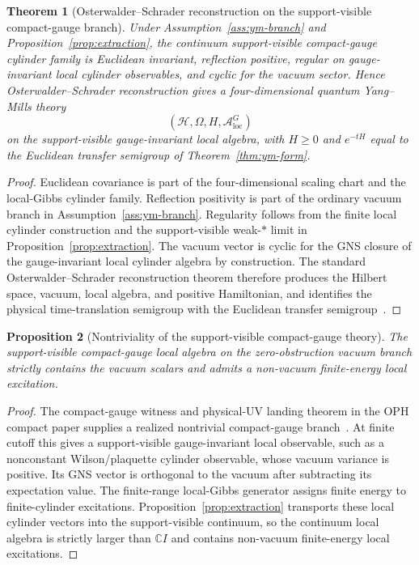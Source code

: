\documentclass[11pt]{article}
\numberwithin{equation}{section}
\newtheorem{theorem}{Theorem}[section]
\newtheorem{proposition}[theorem]{Proposition}
\theoremstyle{remark}
\newcommand{\A}{\mathcal A}
\newcommand{\Hcal}{\mathcal H}
\newcommand{\C}{\mathbb C}
\begin{document}
\begin{theorem}[Osterwalder--Schrader reconstruction on the support-visible compact-gauge branch]
\label{thm:os}
Under Assumption~\ref{ass:ym-branch} and Proposition~\ref{prop:extraction}, the continuum
support-visible compact-gauge cylinder family is Euclidean invariant, reflection positive,
regular on gauge-invariant local cylinder observables, and cyclic for the vacuum sector. Hence
Osterwalder--Schrader reconstruction gives a four-dimensional quantum Yang--Mills theory
\[
(\Hcal,\Omega,H,\A_{\mathrm{loc}}^{G})
\]
on the support-visible gauge-invariant local algebra, with \(H\ge0\) and
\(e^{-tH}\) equal to the Euclidean transfer semigroup of Theorem~\ref{thm:ym-form}.
\end{theorem}

\begin{proof}
Euclidean covariance is part of the four-dimensional scaling chart and the local-Gibbs cylinder
family. Reflection positivity is part of the ordinary vacuum branch in
Assumption~\ref{ass:ym-branch}. Regularity follows from the finite local cylinder construction
and the support-visible weak-\(*\) limit in Proposition~\ref{prop:extraction}. The vacuum vector is
cyclic for the GNS closure of the gauge-invariant local cylinder algebra by construction. The
standard Osterwalder--Schrader reconstruction theorem therefore produces the Hilbert space,
vacuum, local algebra, and positive Hamiltonian, and identifies the physical time-translation
semigroup with the Euclidean transfer semigroup~\cite{osterwalder-schrader1,osterwalder-schrader2}.
\end{proof}

\begin{proposition}[Nontriviality of the support-visible compact-gauge theory]
\label{prop:nontriviality}
The support-visible compact-gauge local algebra on the zero-obstruction vacuum branch strictly
contains the vacuum scalars and admits a non-vacuum finite-energy local excitation.
\end{proposition}

\begin{proof}
The compact-gauge witness and physical-UV landing theorem in the OPH compact paper supplies a
realized nontrivial compact-gauge branch~\cite{oph2}. At finite cutoff this gives a
support-visible gauge-invariant local observable, such as a nonconstant Wilson/plaquette cylinder
observable, whose vacuum variance is positive. Its GNS vector is orthogonal to the vacuum after
subtracting its expectation value. The finite-range local-Gibbs generator assigns finite energy to
finite-cylinder excitations. Proposition~\ref{prop:extraction} transports these local cylinder
vectors into the support-visible continuum, so the continuum local algebra is strictly larger than
\(\C I\) and contains non-vacuum finite-energy local excitations.
\end{proof}
\end{document}
